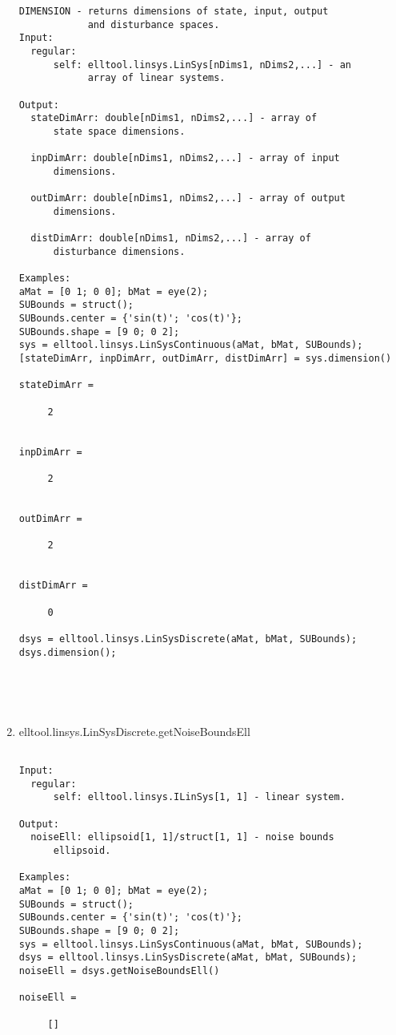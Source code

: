 \begin{enumerate}
\begin{lstlisting}
DIMENSION - returns dimensions of state, input, output
            and disturbance spaces.
Input:
  regular:
      self: elltool.linsys.LinSys[nDims1, nDims2,...] - an
            array of linear systems.

Output:
  stateDimArr: double[nDims1, nDims2,...] - array of
      state space dimensions.

  inpDimArr: double[nDims1, nDims2,...] - array of input
      dimensions.

  outDimArr: double[nDims1, nDims2,...] - array of output
      dimensions.

  distDimArr: double[nDims1, nDims2,...] - array of
      disturbance dimensions.

Examples:
aMat = [0 1; 0 0]; bMat = eye(2);
SUBounds = struct();
SUBounds.center = {'sin(t)'; 'cos(t)'};
SUBounds.shape = [9 0; 0 2];
sys = elltool.linsys.LinSysContinuous(aMat, bMat, SUBounds);
[stateDimArr, inpDimArr, outDimArr, distDimArr] = sys.dimension()

stateDimArr =

     2


inpDimArr =

     2


outDimArr =

     2


distDimArr =

     0

dsys = elltool.linsys.LinSysDiscrete(aMat, bMat, SUBounds);
dsys.dimension();





\end{lstlisting}
\fontfamily{\familydefault}
\selectfont
\item {elltool.linsys.LinSysDiscrete.getNoiseBoundsEll}
\selectfont
\begin{lstlisting}

Input:
  regular:
      self: elltool.linsys.ILinSys[1, 1] - linear system.

Output:
  noiseEll: ellipsoid[1, 1]/struct[1, 1] - noise bounds
      ellipsoid.

Examples:
aMat = [0 1; 0 0]; bMat = eye(2);
SUBounds = struct();
SUBounds.center = {'sin(t)'; 'cos(t)'};
SUBounds.shape = [9 0; 0 2];
sys = elltool.linsys.LinSysContinuous(aMat, bMat, SUBounds);
dsys = elltool.linsys.LinSysDiscrete(aMat, bMat, SUBounds);
noiseEll = dsys.getNoiseBoundsEll()

noiseEll =

     []






\end{lstlisting}
\end{enumerate}
